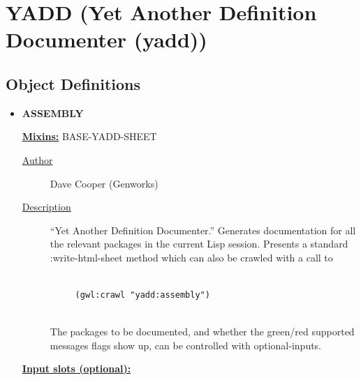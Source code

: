 \documentclass [11pt]{book}
\begin{document}
\section{YADD (Yet Another Definition Documenter (yadd))}

\label{sec:yadd(yetanotherdefinitiondocumenter(yadd))}





\subsection{Object Definitions}

\label{subsec:objectdefinitions}



\begin{itemize}

\item {}
\label{prim:assembly}
\textbf{ASSEMBLY}


\textbf{
\underline{Mixins:}} BASE-YADD-SHEET





\begin{description}

\item [
\underline{Author}]


Dave Cooper (Genworks)



\item [
\underline{Description}]


``Yet Another Definition Documenter.'' Generates 
documentation for all the relevant packages in the current Lisp session. Presents a 
standard :write-html-sheet method which can also be crawled with a call to 


\begin{verbatim}

     (gwl:crawl "yadd:assembly")


\end{verbatim}

The packages to be documented, and whether the green/red supported 
messages flags show up, can be controlled with optional-inputs.



\end{description}








\textbf{
\underline{Input slots (optional):}}


\end{itemize}
\end{document}
